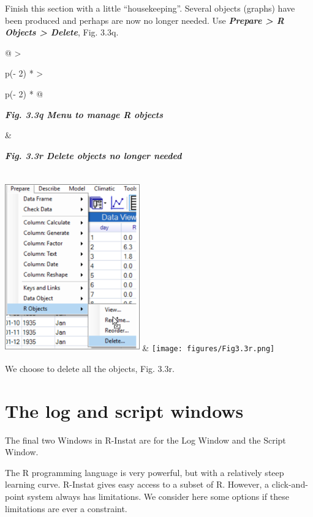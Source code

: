 \documentclass[
  letterpaper,
  DIV=11,
  numbers=noendperiod]{scrreprt}
\begin{document}
Finish this section with a little ``housekeeping''. Several objects
(graphs) have been produced and perhaps are now no longer needed. Use
\textbf{\emph{Prepare \textgreater{} R Objects \textgreater{} Delete}},
Fig. 3.3q.

\begin{longtable}[]{@{}
  >{\raggedright\arraybackslash}p{(\columnwidth - 2\tabcolsep) * }
  >{\raggedright\arraybackslash}p{(\columnwidth - 2\tabcolsep) * }@{}}
\toprule\noalign{}
\begin{minipage}[b]{\linewidth}\raggedright
\textbf{\emph{Fig. 3.3q Menu to manage R objects}}
\end{minipage} & \begin{minipage}[b]{\linewidth}\raggedright
\textbf{\emph{Fig. 3.3r Delete objects no longer needed}}
\end{minipage} \\
\midrule\noalign{}
\endhead
\bottomrule\noalign{}
\endlastfoot
\includegraphics[width=2.28768in,height=2.87769in]{figures/Fig3.3q.png}
&
\texttt{[image: figures/Fig3.3r.png]} \\
\end{longtable}

We choose to delete all the objects, Fig. 3.3r.

\section{The log and script windows}\label{the-log-and-script-windows}

The final two Windows in R-Instat are for the Log Window and the Script
Window.

The R programming language is very powerful, but with a relatively steep
learning curve. R-Instat gives easy access to a subset of R. However, a
click-and-point system always has limitations. We consider here some
options if these limitations are ever a constraint.
\end{document}
